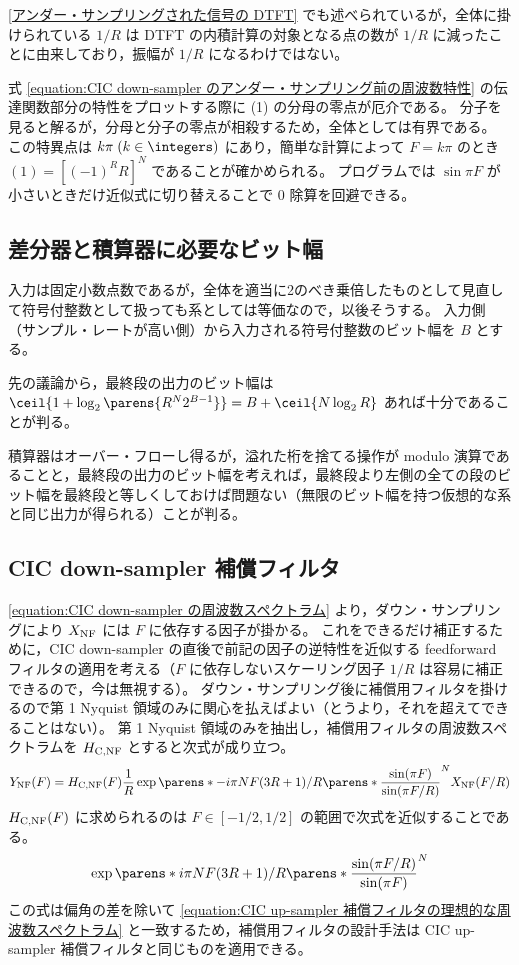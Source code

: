        \ref{アンダー・サンプリングされた信号の DTFT} でも述べられているが，全体に掛けられている $1/R$ は DTFT の内積計算の対象となる点の数が $1/R$ に減ったことに由来しており，振幅が $1/R$ になるわけではない。
        \par
        式 \eqref{equation:CIC down-sampler のアンダー・サンプリング前の周波数特性} の伝達関数部分の特性をプロットする際に (1) の分母の零点が厄介である。
        分子を見ると解るが，分母と分子の零点が相殺するため，全体としては有界である。
        この特異点は $k\pi\;(k\in\integers)$ にあり，簡単な計算によって $F=k\pi$ のとき $(1) = [(-1)^R R]^N$ であることが確かめられる。
        プログラムでは $\sin\pi F$ が小さいときだけ近似式に切り替えることで 0 除算を回避できる。
    \subsection{差分器と積算器に必要なビット幅}
        入力は固定小数点数であるが，全体を適当に2のべき乗倍したものとして見直して符号付整数として扱っても系としては等価なので，以後そうする。
        入力側（サンプル・レートが高い側）から入力される符号付整数のビット幅を $B$ とする。
        \par
        先の議論から，最終段の出力のビット幅は $\ceil{1 + \log_2\parens{R^N 2^{B-1}}} = B + \ceil{N\log_2 R}$ あれば十分であることが判る。
        \par
        積算器はオーバー・フローし得るが，溢れた桁を捨てる操作が modulo 演算であることと，最終段の出力のビット幅を考えれば，最終段より左側の全ての段のビット幅を最終段と等しくしておけば問題ない（無限のビット幅を持つ仮想的な系と同じ出力が得られる）ことが判る。
    \subsection{CIC down-sampler 補償フィルタ}
        \cref{equation:CIC down-sampler の周波数スペクトラム} より，ダウン・サンプリングにより $X_\text{NF}$ には $F$ に依存する因子が掛かる。
        これをできるだけ補正するために，CIC down-sampler の直後で前記の因子の逆特性を近似する feedforward フィルタの適用を考える（$F$ に依存しないスケーリング因子 $1/R$ は容易に補正できるので，今は無視する）。
        ダウン・サンプリング後に補償用フィルタを掛けるので第 1 Nyquist 領域のみに関心を払えばよい（とうより，それを超えてできることはない）。
        第 1 Nyquist 領域のみを抽出し，補償用フィルタの周波数スペクトラムを $H_\text{C,NF}$ とすると次式が成り立つ。
        \[ \YNF(F) = \HCNF(F) \frac{1}{R} \exp\parens*{-i\pi N F(3R+1)/R}\parens*{\frac{\sin(\pi F)}{\sin(\pi F/R)}}^N \XNF(F/R) \]
        $H_\text{C,NF}(F)$ に求められるのは $F \in [-1/2,1/2]$ の範囲で次式を近似することである。
        \begin{equation}
            \exp\parens*{i\pi N F(3R+1)/R}\parens*{\frac{\sin(\pi F/R)}{\sin(\pi F)}}^N
        \end{equation}
        この式は偏角の差を除いて \cref{equation:CIC up-sampler 補償フィルタの理想的な周波数スペクトラム} と一致するため，補償用フィルタの設計手法は CIC up-sampler 補償フィルタと同じものを適用できる。
